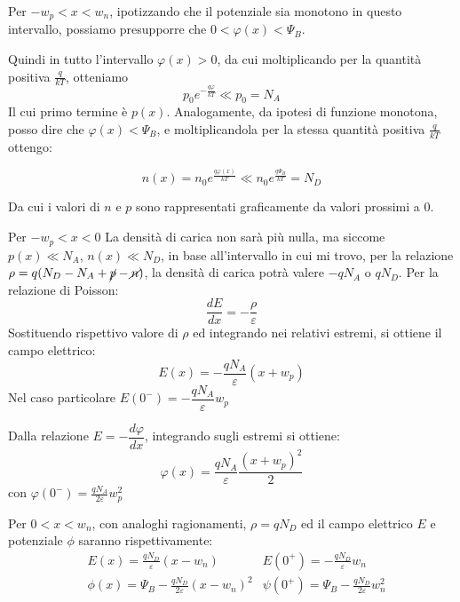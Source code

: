 \documentclass[../template]{subfiles}
\begin{document}
\begin{tcolorbox}[title={Regione svuotata}]
    Per $-w_p < x < w_n$, ipotizzando che il potenziale sia monotono in questo intervallo, possiamo presupporre che $0 < \varphi(x) < \Psi_B$.

    Quindi in tutto l'intervallo $\varphi(x) > 0$, da cui moltiplicando per la quantità positiva $\frac{q}{kT}$, otteniamo
    \[
        p_0 e^{-\frac{q\varphi}{kT}} \ll p_0 = N_A
    \]
    Il cui primo termine è $p(x)$.
    Analogamente, da ipotesi di funzione monotona, posso dire che $\varphi(x) < \Psi_B$, e moltiplicandola per la stessa quantità positiva $\frac{q}{kT}$ ottengo:

    \[
    n(x) = n_0 e^{\frac{q\varphi(x)}{kT}} \ll n_0 e^{\frac{q\Psi_B}{kT}} = N_D
    \]

    Da cui i valori di $n$ e $p$ sono rappresentati graficamente da valori prossimi a 0.
\end{tcolorbox}
\begin{tcolorbox}[title={Regione svuotata e regione di carica}]
    Per $-w_p < x < 0$
    La densità di carica non sarà più nulla, ma siccome $p(x) \ll N_A$, $n(x) \ll N_D$, in base all'intervallo in cui mi trovo, per la relazione $\rho = q(N_D - N_A + \cancel{p} - \cancel{n})$, la densità di carica potrà valere $-qN_A$ o $qN_D$.
    Per la relazione di Poisson:
    $$\dfrac{dE}{dx} = -\dfrac{\rho}{\varepsilon}$$
    Sostituendo rispettivo valore di $\rho$ ed integrando nei relativi estremi, si ottiene il campo elettrico:
    \[
        E(x) = - \frac{qN_A}{\varepsilon} (x + w_p)
    \]
    Nel caso particolare $E(0^-) = -\dfrac{qN_A}{\varepsilon}w_p$

    Dalla relazione $E = -\dfrac{d\varphi}{dx}$, integrando sugli estremi si ottiene:
    \[
        \varphi(x) = \frac{qN_A}{\varepsilon}\frac{{(x + w_p)}^2}{2}
    \]
    con $\varphi(0^-) = \frac{qN_A}{2\varepsilon}w^2_p$
\end{tcolorbox}
\begin{tcolorbox}[title={}]
    Per $0 < x < w_n$, con analoghi ragionamenti, $\rho = qN_D$
    ed il campo elettrico $E$ e potenziale $\phi$ saranno rispettivamente:
    \begin{align*}
        &E(x) = \frac{qN_D}{\varepsilon} (x - w_n) & E(0^+) = - \frac{qN_D}{\varepsilon} w_n\\
        &\phi(x) = \Psi_B - \frac{qN_D}{2\varepsilon} {(x - w_n)}^2 & \psi(0^+) = \Psi_B - \frac{qN_D}{2\varepsilon} w_n^2
    \end{align*}
\end{tcolorbox}
\end{document}

